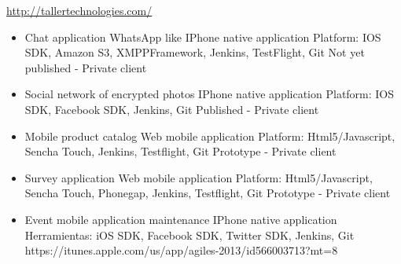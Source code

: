 \documentclass[11pt,a4paper]{moderncv}
\begin{document}
{
    \url{http://tallertechnologies.com/}
    \begin{itemize}
        \item Chat application WhatsApp like
            \newline{}
            IPhone native application
            \newline{}
            Platform: IOS SDK, Amazon S3, XMPPFramework, Jenkins, TestFlight, Git
            \newline{}
            Not yet published - Private client
            \newline{}
        \item Social network of encrypted photos
            \newline{}
            IPhone native application
            \newline{}
            Platform: IOS SDK, Facebook SDK, Jenkins, Git
            \newline{}
            Published - Private client
            \newline{}
        \item Mobile product catalog
            \newline{}
            Web mobile application
            \newline{}
            Platform: Html5/Javascript, Sencha Touch, Jenkins, Testflight, Git
            \newline{}
            Prototype - Private client
            \newline{}
        \item Survey application
            \newline{}
            Web mobile application
            \newline{}
            Platform: Html5/Javascript, Sencha Touch, Phonegap, Jenkins, Testflight, Git
            \newline{}
            Prototype - Private client
            \newline{}
        \item Event mobile application maintenance
            \newline{}
            IPhone native application
            \newline{}
            Herramientas: iOS SDK, Facebook SDK, Twitter SDK, Jenkins, Git
            \newline{}
            https://itunes.apple.com/us/app/agiles-2013/id566003713?mt=8

\end{itemize}}
\end{document}
